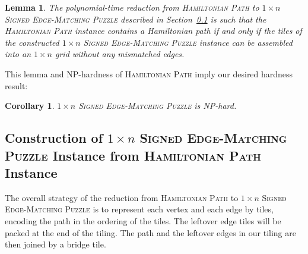\documentclass[11pt]{article}
\newtheorem{lemma}{Lemma}
\newtheorem{corollary}{Corollary}
\begin{document}
\begin{lemma} \label{lem:exactsempred}
The polynomial-time reduction from \textsc{Hamiltonian Path} to \textsc{$1 \times n$ Signed Edge-Matching Puzzle} described in Section~\ref{sec:red-semp} is such that the \textsc{Hamiltonian Path} instance contains a Hamiltonian path if and only if the tiles of the constructed \textsc{$1 \times n$ Signed Edge-Matching Puzzle} instance can be assembled into an $1\times n$ grid without any mismatched edges.
\end{lemma}

This lemma and NP-hardness of \textsc{Hamiltonian Path} imply our desired hardness result:

\begin{corollary} \label{lem:exactsemp}
\textsc{$1 \times n$ Signed Edge-Matching Puzzle} is NP-hard.
\end{corollary}

\subsection{Construction of \textsc{$1 \times n$ Signed Edge-Matching Puzzle} Instance from \textsc{Hamiltonian Path} Instance} \label{sec:red-semp}

The overall strategy of the reduction from \textsc{Hamiltonian Path} to \textsc{$1 \times n$ Signed Edge-Matching Puzzle} is to represent each vertex and each edge by tiles, encoding the path in the ordering of the tiles. The leftover edge tiles will be packed at the end of the tiling. The path and the leftover edges in our tiling are then joined by a bridge tile.
\end{document}
